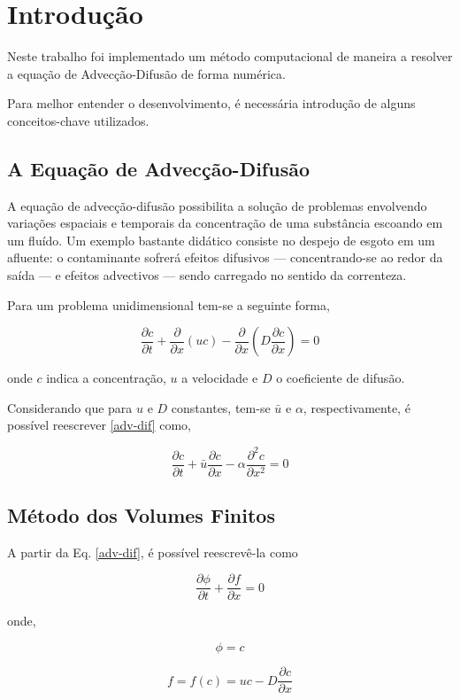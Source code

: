 \chapter{Introdução}
Neste trabalho foi implementado um método computacional de maneira a resolver
a equação de Advecção-Difusão de forma numérica.

Para melhor entender o desenvolvimento, é necessária introdução de alguns
conceitos-chave utilizados.

\section{A Equação de Advecção-Difusão}
A equação de advecção-difusão possibilita a solução de problemas envolvendo
variações espaciais e temporais da concentração de uma substância escoando em um
fluído. Um exemplo bastante didático consiste no despejo de esgoto em um
afluente: o contaminante sofrerá efeitos difusivos --- concentrando-se ao redor
da saída --- e efeitos advectivos --- sendo carregado no sentido da correnteza.

Para um problema unidimensional tem-se a seguinte forma,

\begin{equation} \label{adv-dif}
    \frac{\partial c}{\partial t} + \frac{\partial}{\partial x}(uc)
    - \frac{\partial}{\partial x}\left( D \frac{\partial c}{\partial x} \right)
    = 0
\end{equation}

\noindent onde $c$ indica a concentração, $u$ a velocidade e $D$ o coeficiente
de difusão.

Considerando que para $u$ e $D$ constantes, tem-se $\bar{u}$ e $\alpha$,
respectivamente, é possível reescrever \ref{adv-dif} como,

\begin{equation}
    \frac{\partial c}{\partial t} + \bar{u}\frac{\partial c}{\partial x} -
    \alpha\frac{\partial^2 c}{\partial x^2} = 0
\end{equation}

\section{Método dos Volumes Finitos}
A partir da Eq. \ref{adv-dif}, é possível reescrevê-la como

\begin{equation}
    \frac{\partial\phi}{\partial t} + \frac{\partial f}{\partial x} = 0
\end{equation}

\noindent onde,

\noindent
\begin{minipage}{.4\linewidth}
    \begin{equation}
        \phi = c
    \end{equation}
\end{minipage}%
\begin{minipage}{.6\linewidth}
    \begin{equation}
        f = f(c) = uc - D\frac{\partial c}{\partial x}
    \end{equation}
\end{minipage}


